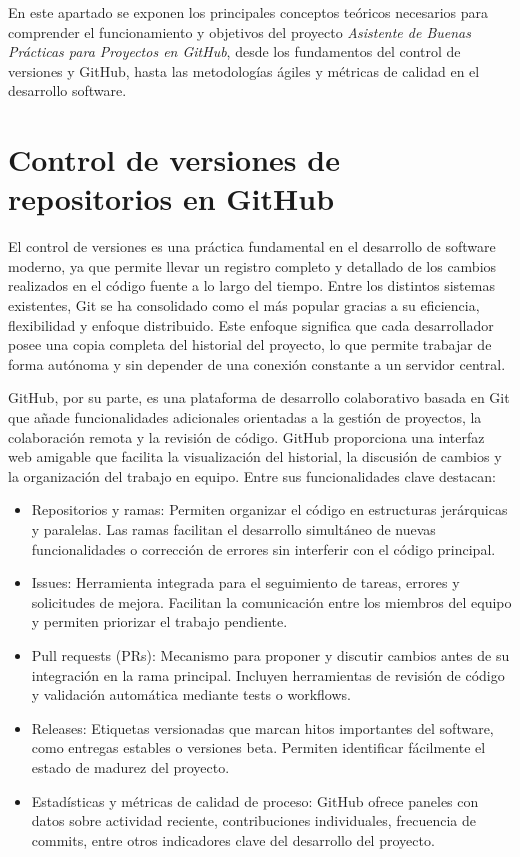 
En este apartado se exponen los principales conceptos teóricos necesarios para comprender el funcionamiento y objetivos del proyecto \textit{Asistente de Buenas Prácticas para Proyectos en GitHub}, desde los fundamentos del control de versiones y GitHub, hasta las metodologías ágiles y métricas de calidad en el desarrollo software.

\section{Control de versiones de repositorios en GitHub}
El control de versiones es una práctica fundamental en el desarrollo de software moderno, ya que permite llevar un registro completo y detallado de los cambios realizados en el código fuente a lo largo del tiempo. Entre los distintos sistemas existentes, Git se ha consolidado como el más popular gracias a su eficiencia, flexibilidad y enfoque distribuido. Este enfoque significa que cada desarrollador posee una copia completa del historial del proyecto, lo que permite trabajar de forma autónoma y sin depender de una conexión constante a un servidor central.

GitHub, por su parte, es una plataforma de desarrollo colaborativo basada en Git que añade funcionalidades adicionales orientadas a la gestión de proyectos, la colaboración remota y la revisión de código. GitHub proporciona una interfaz web amigable que facilita la visualización del historial, la discusión de cambios y la organización del trabajo en equipo. Entre sus funcionalidades clave destacan:

\begin{itemize}
\item Repositorios y ramas: Permiten organizar el código en estructuras jerárquicas y paralelas. Las ramas facilitan el desarrollo simultáneo de nuevas funcionalidades o corrección de errores sin interferir con el código principal.
\item Issues: Herramienta integrada para el seguimiento de tareas, errores y solicitudes de mejora. Facilitan la comunicación entre los miembros del equipo y permiten priorizar el trabajo pendiente.
\item Pull requests (PRs): Mecanismo para proponer y discutir cambios antes de su integración en la rama principal. Incluyen herramientas de revisión de código y validación automática mediante tests o workflows.
\item Releases: Etiquetas versionadas que marcan hitos importantes del software, como entregas estables o versiones beta. Permiten identificar fácilmente el estado de madurez del proyecto.
\item Estadísticas y métricas de calidad de proceso: GitHub ofrece paneles con datos sobre actividad reciente, contribuciones individuales, frecuencia de commits, entre otros indicadores clave del desarrollo del proyecto.
\end{itemize}

